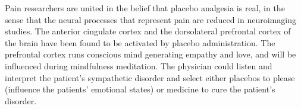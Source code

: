 \documentclass[12pt, a4paper]{article}
\begin{document}
Pain researchers are united in the belief that placebo analgesia is real, in the sense that the neural processes that represent pain are reduced in neuroimaging studies\cite{Bennett2018}. 
The anterior cingulate cortex and the dorsolateral prefrontal cortex of the brain have been found to be activated by placebo administration\cite{Benedetti2005}\cite{Benedetti2011}\cite{Carlino2011}\cite{Bennett2018}. 
The prefrontal cortex runs conscious mind generating empathy and love, and will be influenced during mindfulness meditation\cite{Krummenacher2010}\cite{Bennett2018}.
The physician could listen and interpret the patient's sympathetic disorder and select either placebos to please (influence the patients' emotional states) or medicine to cure the patient's disorder.
\end{document}
